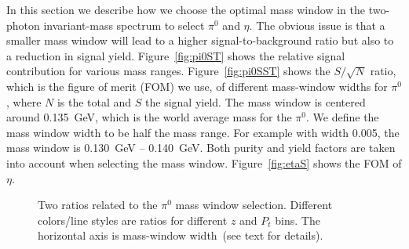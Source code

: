 In this section we describe how we choose the optimal mass window in the two-photon invariant-mass spectrum 
to select $\pi^0$ and $\eta$. The obvious issue is that a smaller mass window will lead to a higher signal-to-background ratio but also to a reduction in signal yield. Figure~\ref{fig:pi0ST} shows the relative signal contribution for various mass ranges. Figure~\ref{fig:pi0SST} shows the $S/\sqrt{N}$ ratio, which is the figure of merit (FOM) we use, of different mass-window widths for $\pi^0$, where $N$ is the total  and $S$ the signal yield. The mass window is centered around 0.135~GeV, which is the world average mass for the  $\pi^0$. We define the mass window width to be half  the mass range. For example with width 0.005, the mass window is 0.130~GeV -- 0.140~GeV. Both purity and yield factors are taken into account when selecting the mass window. Figure~\ref{fig:etaS} shows the FOM of $\eta$.
\begin{figure}
\centering     %
{}
\caption[Two ratios of signal and background yields related to the $\pi^0$ mass window selection]{Two ratios related to the $\pi^0$ mass window selection. Different colors/line styles are ratios for different $z$ and $P_t$ bins. The horizontal axis is mass-window width~(see text for details).}
\label{fig:pi0S}
\end{figure}

